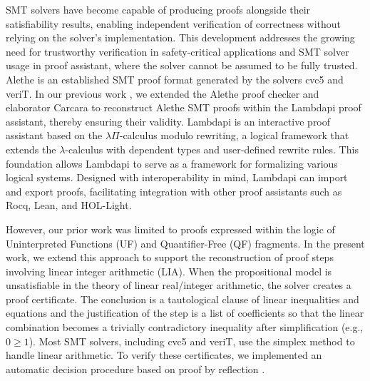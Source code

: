 \documentclass[runningheads]{llncs}
\begin{document}
SMT solvers have become capable of producing proofs alongside their satisfiability results,  enabling independent verification of correctness without relying on the solver's implementation.
This development addresses the growing need for trustworthy verification in safety-critical applications and SMT solver usage in proof assistant, where the solver cannot be assumed to be fully trusted.
Alethe \cite{alethe,alethespec} is an established SMT proof format generated by the solvers cvc5 and veriT. In our previous work \cite{ColtellacciMD24}, we extended the Alethe proof checker and elaborator Carcara \cite{carcara} to
reconstruct Alethe SMT proofs within the Lambdapi proof assistant, thereby ensuring their validity.
Lambdapi is an interactive proof assistant based on the $\lambda\Pi$-calculus modulo rewriting, a logical framework that extends the $\lambda$-calculus with dependent types and user-defined rewrite rules.
This foundation allows Lambdapi to serve as a framework for formalizing various logical systems.
Designed with interoperability in mind, Lambdapi can import and export proofs, facilitating integration with other proof assistants such as Rocq, Lean, and HOL-Light. 

However, our prior work was limited to proofs expressed within the logic of Uninterpreted Functions (UF) and Quantifier-Free (QF) fragments. 
In the present work, we extend this approach to support the reconstruction of proof steps involving linear integer arithmetic (LIA).
When the propositional model is unsatisfiable in the theory of linear real/integer arithmetic, the solver creates a proof certificate.
The conclusion is a tautological clause of linear inequalities and equations and the justification of the step is a list of coefficients so that the linear combination becomes a trivially contradictory inequality after simplification (e.g., $0 \geq 1$).
Most SMT solvers, including cvc5 and veriT, use the simplex method \cite{SRI:simplex:dpllt} to handle linear arithmetic.
To verify these certificates, we implemented an automatic decision procedure based on proof by reflection \cite{reflection-origin-coq,ring-coq}.
\end{document}
